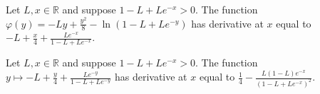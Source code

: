 \begin{lemma}
\label{bernoulli_mgf_bound_step1}
\leanok
{}
Let $L,x\in\mathbb{R}$ and suppose $1-L+Le^{-x}>0$. The function
$\varphi(y)=-Ly+\frac{y^2}{8}-\ln(1-L+Le^{-y})$ has derivative at $x$ equal to
$-L+\frac{x}{4}+\frac{Le^{-x}}{1-L+Le^{-x}}$.
\end{lemma}

\begin{lemma}
\label{bernoulli_mgf_bound_step2}
\leanok
{}
Let $L,x\in\mathbb{R}$ and suppose $1-L+Le^{-x}>0$. The function $y\mapsto
-L+\frac{y}{4}+\frac{Le^{-y}}{1-L+Le^{-y}}$ has derivative at $x$ equal to
$\frac14-\frac{L(1-L)e^{-x}}{(1-L+Le^{-x})^2}$.
\end{lemma}
